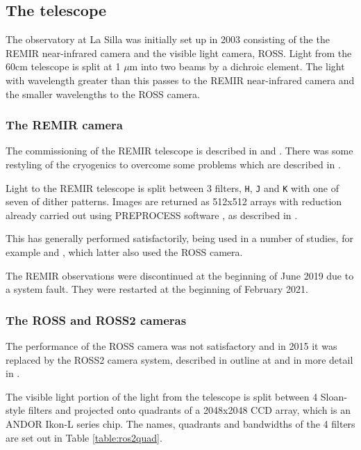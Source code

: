 \subsection{The {\rem} telescope}
\protect\label{section:remscope}

The {\rem} observatory at La Silla was initially set up in 2003
\citep{antonelli05} consisting of the the REMIR near-infrared camera and the
visible light camera, ROSS. Light from the 60cm telescope is split at 1 $\mu$m into two beams
by a dichroic element. The light with wavelength greater than this passes to the
REMIR near-infrared camera and the smaller wavelengths to the ROSS camera.

\subsubsection{The REMIR camera}

The commissioning of the REMIR telescope is described in \citet{conconi04} and
\citet{vitali03}. There was some restyling of the cryogenics to overcome some
problems which are described in \citet{vitali06}.

Light to the REMIR telescope is split between 3 filters, \texttt{H}, \texttt{J}
and \texttt{K} with one of seven of dither patterns. Images are returned as
512x512 arrays with reduction already carried out using PREPROCESS software
\citep{dipaola01}, as described in \citet{calzoletti05}.

This has generally performed satisfactorily, being used in a number of studies,
for example \citet{dammando11} and  \citet{davanzo06}, which latter also used the ROSS camera.

The REMIR observations were discontinued at the beginning of June 2019 due to a
system fault. They were restarted at the beginning of February 2021.

\subsubsection{The ROSS and ROSS2 cameras}

The performance of the ROSS camera was not satisfactory and in 2015 it
was replaced by the ROSS2 camera system, described in outline at
\citet{reminaf7} and in more detail in \citet{molinari14}.

The visible light portion of the light from the telescope is split between 4
Sloan-style filters and projected onto quadrants of a 2048x2048 CCD array, which
is an ANDOR Ikon-L series chip. The names, quadrants and bandwidths of the 4
filters are set out in Table \ref{table:ros2quad}.


